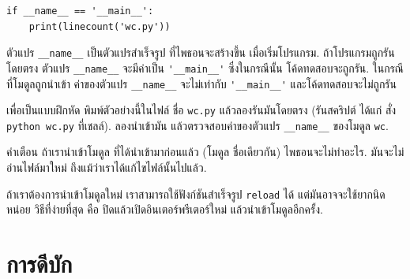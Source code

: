 \begin{verbatim}
if __name__ == '__main__':
    print(linecount('wc.py'))
\end{verbatim}
%
%
ตัวแปร \verb|__name__| เป็นตัวแปรสำเร็จรูป ที่ไพธอนจะสร้างขึ้น เมื่อเริ่มโปรแกรม.
ถ้าโปรแกรมถูกรันโดยตรง ตัวแปร \verb|__name__| จะมีค่าเป็น \verb|'__main__'|
ซึ่งในกรณีนั้น โค้ดทดสอบจะถูกรัน.
ในกรณีที่โมดูลถูกนำเข้า ค่าของตัวแปร \verb|__name__| จะไม่เท่ากับ \verb|'__main__'| และโค้ดทดสอบจะไม่ถูกรัน


เพื่อเป็นแบบฝึกหัด พิมพ์ตัวอย่างนี้ในไฟล์ ชื่อ \texttt{wc.py}
แล้วลองรันมันโดยตรง (รันสคริปต์ ได้แก่ สั่ง \texttt{python wc.py} ที่เชลล์).
ลองนำเข้ามัน แล้วตรวจสอบค่าของตัวแปร \verb|__name__| ของโมดูล \texttt{wc}.


คำเตือน ถ้าเรานำเข้าโมดูล ที่ได้นำเข้ามาก่อนแล้ว (โมดูล ชื่อเดียวกัน)
ไพธอนจะไม่ทำอะไร.
มันจะไม่อ่านไฟล์มาใหม่ ถึงแม้ว่าเราได้แก้ไขไฟล์นั้นไปแล้ว.


ถ้าเราต้องการนำเข้าโมดูลใหม่
เราสามารถใช้ฟังก์ชันสำเร็จรูป \texttt{reload} ได้
แต่มันอาจจะใช้ยากนิดหน่อย 
วิธีที่ง่ายที่สุด คือ ปิดแล้วเปิดอินเตอร์พรีเตอร์ใหม่ แล้วนำเข้าโมดูลอีกครั้ง.

\section{การดีบัก}

